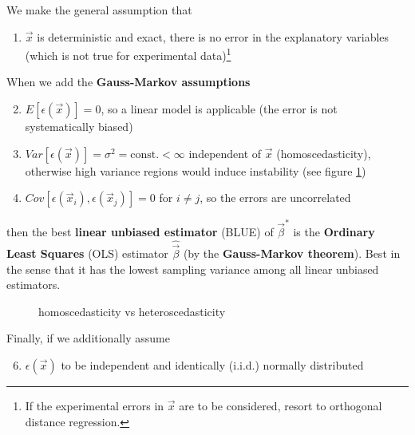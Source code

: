 

We make the general assumption that
\begin{enumerate}
    \item $\vec{x}$ is deterministic and exact, there is no error in the explanatory variables \textcolor{red1}{(which is not true for experimental data)}\footnote{If the experimental errors in $\vec{x}$ are to be considered, resort to orthogonal distance regression.}
\end{enumerate}

When we add the \textbf{Gauss-Markov assumptions}
\begin{enumerate}
    \setcounter{enumi}{1}
    \item $E[\epsilon(\vec{x})] = 0$, so a linear model is applicable (the error is not systematically biased)
    \item $Var[\epsilon(\vec{x})] = \sigma^2 = \text{const.} < \infty$ independent of $\vec{x}$ (homoscedasticity), otherwise
    high variance regions would induce instability (see figure \ref{fig:homo_hetero})
    \item $Cov[\epsilon(\vec{x}_i), \epsilon(\vec{x}_j)] = 0$ for $i \neq j$, so the errors are uncorrelated
\end{enumerate}
then the best \textbf{linear unbiased estimator} (BLUE) of $\vec{\beta}^*$ is the \textbf{Ordinary Least Squares} (OLS) estimator $\hat{\vec{\beta}}$ (by the \textbf{Gauss-Markov theorem}).
Best in the sense that it has the \textcolor{green1}{lowest sampling variance} among all linear unbiased estimators.

\begin{figure}[!htb]
 \centering
 \hfill
 \caption{homoscedasticity vs heteroscedasticity}
 \label{fig:homo_hetero}
\end{figure}

Finally, if we additionally assume

\begin{enumerate}
    \setcounter{enumi}{5}
    \item $\epsilon(\vec{x})$ to be independent and identically (i.i.d.) normally distributed
\end{enumerate}

